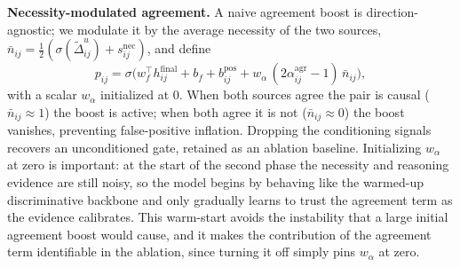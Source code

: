 \documentclass[journal]{IEEEtran}
\begin{document}
\noindent\textbf{Necessity-modulated agreement.} A naive agreement boost is
direction-agnostic; we modulate it by the average necessity of the two sources,
$\bar n_{ij}=\tfrac{1}{2}(\sigma(\tilde\Delta_{ij}^{u})+s_{ij}^{\mathrm{nec}})$, and define
\begin{equation}
p_{ij}=\sigma\!\big(w_f^{\top}h_{ij}^{\mathrm{final}}+b_f+b_{ij}^{\mathrm{pos}}+w_\alpha\,(2\alpha_{ij}^{\mathrm{agr}}-1)\,\bar n_{ij}\big),
\end{equation}
with a scalar $w_\alpha$ initialized at $0$. When both sources agree the pair is causal
($\bar n_{ij}\!\approx\!1$) the boost is active; when both agree it is not
($\bar n_{ij}\!\approx\!0$) the boost vanishes, preventing false-positive inflation. Dropping
the conditioning signals recovers an unconditioned gate, retained as an ablation baseline.
Initializing $w_\alpha$ at zero is important: at the start of the second phase the necessity
and reasoning evidence are still noisy, so the model begins by behaving like the warmed-up
discriminative backbone and only gradually learns to trust the agreement term as the evidence
calibrates. This warm-start avoids the instability that a large initial agreement boost would
cause, and it makes the contribution of the agreement term identifiable in the ablation, since
turning it off simply pins $w_\alpha$ at zero.
\end{document}
